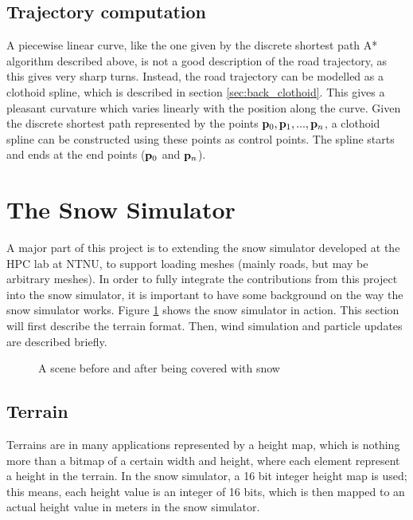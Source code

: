 \subsection{Trajectory computation}
A piecewise linear curve, like the one given by the discrete shortest path A* algorithm described above, is not a good description of the road trajectory, as this gives very sharp turns. Instead, the road trajectory can be modelled as a clothoid spline\cite{roadgen}, which is described in section \ref{sec:back_clothoid}. This gives a pleasant curvature which varies linearly with the position along the curve\cite{clothoid}. Given the discrete shortest path represented by the points ${\mathbf p}_0, {\mathbf p}_1, ..., {\mathbf p}_n$, a clothoid spline can be constructed using these points as control points. The spline starts and ends at the end points (${\mathbf p}_0$ and ${\mathbf p}_n$). 

\section{The Snow Simulator}
A major part of this project is to extending the snow simulator developed at the HPC lab at NTNU, to support loading meshes (mainly roads, but may be arbitrary meshes). In order to fully integrate the contributions from this project into the snow simulator, it is important to have some background on the way the snow simulator works. Figure \ref{fig:back_snowsim_screenshots} shows the snow simulator in action. This section will first describe the terrain format. Then, wind simulation and particle updates are described briefly.

\begin{figure}[ht]
\caption{A scene before and after being covered with snow}
\label{fig:back_snowsim_screenshots}
\end{figure}


\subsection{Terrain}
Terrains are in many applications represented by a height map, which is nothing more than a bitmap of a certain width and height, where each element represent a height in the terrain. In the snow simulator, a 16 bit integer height map is used; this means, each height value is an integer of 16 bits, which is then mapped to an actual height value in meters in the snow simulator. 

